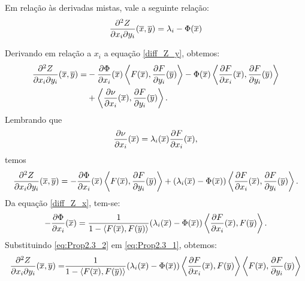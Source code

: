 \begin{proposicao}
Em rela\c c\~ao \`as derivadas mistas, vale a seguinte rela\c c\~ao:
\begin{equation}\label{diff_Z_x_y}
\frac{\partial^2 Z}{\partial x_i \partial y_i}(\overline{x},\overline{y}) = \lambda_i - \Phi(\overline{x})
\end{equation}
\end{proposicao}
\begin{demonstracao}
Derivando em rela\c c\~ao  a $x_i$ a equação \eqref{diff_Z_y}, obtemos:
\begin{eqnarray*}
\begin{aligned}
\frac{\partial^2 Z}{\partial x_i \partial y_i}(\overline{x},\overline{y}) =  & 
-\frac{\partial \Phi}{\partial x_i}(\overline{x}) \left\langle F(\overline{x}), 
\frac{\partial F}{\partial y_i}(\overline{y}) \right\rangle - \Phi(\overline{x})
\left\langle \frac{\partial F}{\partial x_i}(\overline{x}), 
\frac{\partial F}{\partial y_i}(\overline{y}) \right\rangle \\
& + \left\langle \frac{\partial \nu}{\partial x_i}(\overline{x}), 
\frac{\partial F}{\partial y_i}(\overline{y}) \right\rangle.
\end{aligned}
\end{eqnarray*}	
Lembrando que 
\[
\frac{\partial \nu}{\partial x_i}(\overline{x}) = 
\lambda_i(\overline{x}) \frac{\partial F}{\partial x_i}(\overline{x}),
\]
temos
\begin{eqnarray} \label{eq:Prop2.3_1}
\frac{\partial^2 Z}{\partial x_i \partial y_i}(\overline{x},\overline{y}) = -\frac{\partial \Phi}{\partial x_i}(\overline{x}) \left\langle F(\overline{x}), \frac{\partial F}{\partial y_i}(\overline{y}) \right\rangle + (\lambda_i(\overline{x}) - \Phi(\overline{x})) \left\langle \frac{\partial F}{\partial x_i}(\overline{x}), \frac{\partial F}{\partial y_i}(\overline{y}) \right\rangle.
\end{eqnarray}	
Da equa\c c\~ao \eqref{diff_Z_x}, tem-se:
\begin{eqnarray} \label{eq:Prop2.3_2}
-\frac{\partial \Phi}{\partial x_i}(\overline{x}) = \frac{1}
{1 - \langle F(\overline{x}),F(\overline{y}) \rangle} (\lambda_i(\overline{x}) - \Phi(\overline{x})) 
\left\langle \frac{\partial F}{\partial x_i}(\overline{x}), F(\overline{y}) \right\rangle.
\end{eqnarray}
Substituindo \eqref{eq:Prop2.3_2} em \eqref{eq:Prop2.3_1}, 
obtemos:
\begin{eqnarray*}
\begin{aligned}
\frac{\partial^2 Z}{\partial x_i \partial y_i}(\xb,\yb) =&  \frac{1}{1 - \langle F(\xb),F(\yb) \rangle} (\lambda_i(\xb) - \Phi(\xb)) \left\langle \frac{\partial F}{\partial x_i}(\xb), F(\yb) \right\rangle  \left\langle F(\xb), \frac{\partial F}{\partial y_i}(\yb) \right\rangle \\

\end{aligned}
\end{eqnarray*}
\end{demonstracao}
